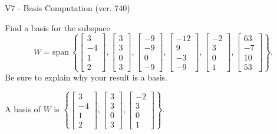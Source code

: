 \begin{exercise}
  \begin{exerciseTitle}V7 - Basis Computation (ver. 740)\end{exerciseTitle}
  \begin{exerciseStatement}
    Find a basis for the subspace 
\[W=\mathrm{span}\ \left\{\left[\begin{array}{r}
3 \\
-4 \\
1 \\
2
\end{array}\right] , \left[\begin{array}{r}
3 \\
3 \\
0 \\
3
\end{array}\right] , \left[\begin{array}{r}
-9 \\
-9 \\
0 \\
-9
\end{array}\right] , \left[\begin{array}{r}
-12 \\
9 \\
-3 \\
-9
\end{array}\right] , \left[\begin{array}{r}
-2 \\
3 \\
0 \\
1
\end{array}\right] , \left[\begin{array}{r}
63 \\
-7 \\
10 \\
53
\end{array}\right]\right\}.\]
 Be sure to explain why your result is a basis.


  \end{exerciseStatement}
  \begin{exerciseAnswer}
   A basis of \(W\) is  \(\left\{\left[\begin{array}{r}
3 \\
-4 \\
1 \\
2
\end{array}\right] , \left[\begin{array}{r}
3 \\
3 \\
0 \\
3
\end{array}\right] , \left[\begin{array}{r}
-2 \\
3 \\
0 \\
1
\end{array}\right]\right\}\).
  


  \end{exerciseAnswer}
\end{exercise}